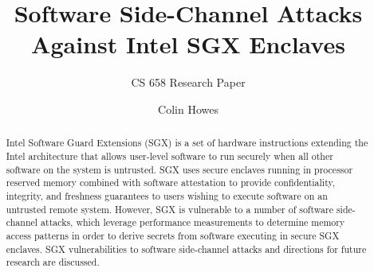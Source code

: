 \documentclass[sigconf]{acmart}
\begin{document}
\title{Software Side-Channel Attacks Against Intel SGX Enclaves}
\subtitle{CS 658 Research Paper}


\author{Colin Howes}

\begin{abstract}

Intel Software Guard Extensions (SGX) is a set of hardware instructions extending the Intel architecture that allows user-level software to run securely when all other software on the system is untrusted. SGX uses secure enclaves running in processor reserved memory combined with software attestation to provide confidentiality, integrity, and freshness guarantees to users wishing to execute software on an untrusted remote system. However, SGX is vulnerable to a number of software side-channel attacks, which leverage performance measurements to determine memory access patterns in order to derive secrets from software executing in secure SGX enclaves. SGX vulnerabilities to software side-channel attacks and directions for future research are discussed.

\end{abstract}

\maketitle




 
\end{document}
